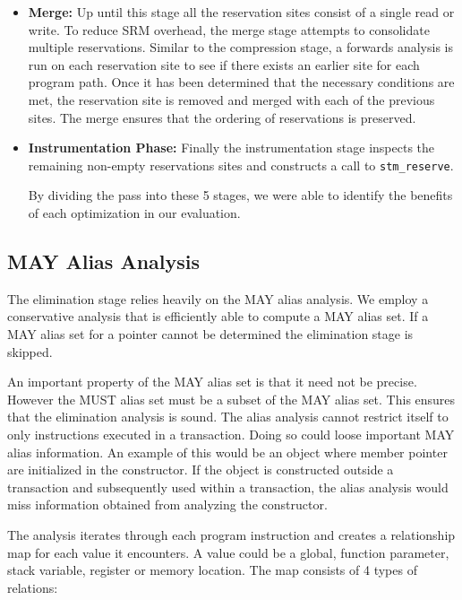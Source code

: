 \documentclass[preprint]{sigplanconf}
\begin{document}
\begin{itemize}
    \item {\bf Merge:} Up until this stage all the reservation sites consist of a single read or write. To reduce SRM overhead, the merge stage attempts to consolidate multiple reservations. Similar to the compression stage, a forwards analysis is run on each reservation site to see if there exists an earlier site for each program path. Once it has been determined that the necessary conditions are met, the reservation site is removed and merged with each of the previous sites. The merge ensures that the ordering of reservations is preserved.

    \item {\bf Instrumentation Phase:} Finally the instrumentation stage inspects the remaining non-empty reservations sites and constructs a call to \verb+stm_reserve+.

        By dividing the pass into these 5 stages, we were able to identify the benefits of each optimization in our evaluation.

\end{itemize}

\subsection{MAY Alias Analysis}

The elimination stage relies heavily on the MAY alias analysis. We employ a conservative analysis that is efficiently able to compute a MAY alias set. If a MAY alias set for a pointer cannot be determined the elimination stage is skipped.

An important property of the MAY alias set is that it need not be precise. However the MUST alias set must be a subset of the MAY alias set. This ensures that the elimination analysis is sound. The alias analysis cannot restrict itself to only instructions executed in a transaction. Doing so could loose important MAY alias information. An example of this would be an object where member pointer are initialized in the constructor. If the object is constructed outside a transaction and subsequently used within a transaction, the alias analysis would miss information obtained from analyzing the constructor.

The analysis iterates through each program instruction and creates a relationship map for each value it encounters. A value could be a global, function parameter, stack variable, register or memory location. The map consists of 4 types of relations:
\end{document}
